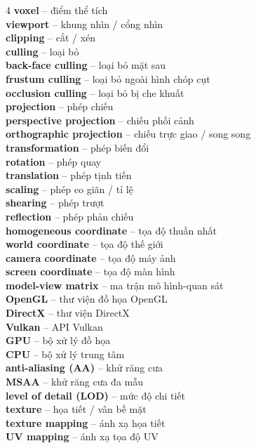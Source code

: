 \begin{multicols}{4}
\textbf{voxel} -- điểm thể tích\\
\textbf{viewport} -- khung nhìn / cổng nhìn\\
\textbf{clipping} -- cắt / xén\\
\textbf{culling} -- loại bỏ\\
\textbf{back-face culling} -- loại bỏ mặt sau\\
\textbf{frustum culling} -- loại bỏ ngoài hình chóp cụt\\
\textbf{occlusion culling} -- loại bỏ bị che khuất\\
\textbf{projection} -- phép chiếu\\
\textbf{perspective projection} -- chiếu phối cảnh\\
\textbf{orthographic projection} -- chiếu trực giao / song song\\
\textbf{transformation} -- phép biến đổi\\
\textbf{rotation} -- phép quay\\
\textbf{translation} -- phép tịnh tiến\\
\textbf{scaling} -- phép co giãn / tỉ lệ\\
\textbf{shearing} -- phép trượt\\
\textbf{reflection} -- phép phản chiếu\\
\textbf{homogeneous coordinate} -- tọa độ thuần nhất\\
\textbf{world coordinate} -- tọa độ thế giới\\
\textbf{camera coordinate} -- tọa độ máy ảnh\\
\textbf{screen coordinate} -- tọa độ màn hình\\
\textbf{model-view matrix} -- ma trận mô hình-quan sát\\
\textbf{OpenGL} -- thư viện đồ họa OpenGL\\
\textbf{DirectX} -- thư viện DirectX\\
\textbf{Vulkan} -- API Vulkan\\
\textbf{GPU} -- bộ xử lý đồ họa\\
\textbf{CPU} -- bộ xử lý trung tâm\\
\textbf{anti-aliasing (AA)} -- khử răng cưa\\
\textbf{MSAA} -- khử răng cưa đa mẫu\\
\textbf{level of detail (LOD)} -- mức độ chi tiết\\
\textbf{texture} -- họa tiết / vân bề mặt\\
\textbf{texture mapping} -- ánh xạ họa tiết\\
\textbf{UV mapping} -- ánh xạ tọa độ UV\\

\end{multicols}
